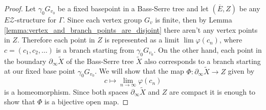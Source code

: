 \documentclass[12pt, a4paper]{article}
\newcommand{\8}{\infty}
\theoremstyle{break}
\theoremstyle{defbreak}
\newcommand{\ol}[1]{\overline{#1}}
\newcommand{\wtl}[1]{\widetilde{#1}}
\begin{document}
\begin{proof}
    Let $\gamma_0 G_{v_0}$ be a fixed basepoint in a Bass-Serre tree and let $(\ol{E},Z)$ be any $E\mathcal{Z}$-structure for $\Gamma$. Since each vertex group $G_v$ is finite, then by Lemma \ref{lemma:vertex_and_branch_points_are_disjoint} there aren't any vertex points in $Z$. Therefore each point in $Z$ is represented as a limit $\lim \varphi(c_n)$, where $c = (c_1, c_2, \ldots)$ is a branch starting from $\gamma_0G_{v_0}$. On the other hand, each point in the boundary $\partial_\8\wtl{X}$ of the Bass-Serre tree $\wtl{X}$ also corresponds to a branch starting at our fixed base point $\gamma_0G_{v_0}$. We will show that the map $\Phi\colon \partial_\8\wtl{X} \to Z$ given by 
    $$c \mapsto \lim_{n\to\8} \varphi(c_n)$$
    is a homeomorphism. Since both spaces $\partial_{\8}\wtl{X}$ and $Z$ are compact it is enough to show that $\Phi$ is a bijective open map.


\end{proof}
\end{document}
